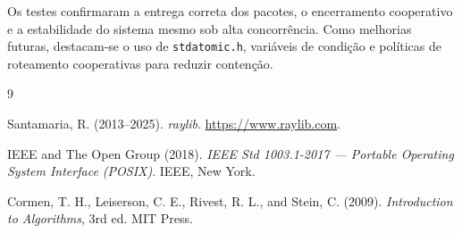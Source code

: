 \documentclass[12pt]{article}
\begin{document}
Os testes confirmaram a entrega correta dos pacotes, o encerramento cooperativo
e a estabilidade do sistema mesmo sob alta concorrência. Como melhorias futuras,
destacam-se o uso de \texttt{stdatomic.h}, variáveis de condição e políticas de
roteamento cooperativas para reduzir contenção.
\begin{thebibliography}{9}

Santamaria, R. (2013--2025).  \textit{raylib}.
\url{https://www.raylib.com}.

IEEE and The Open Group (2018).  \textit{IEEE Std 1003.1-2017 --- Portable
Operating System Interface (POSIX)}.  IEEE, New York.

Cormen, T. H., Leiserson, C. E., Rivest, R. L., and Stein, C. (2009).
\textit{Introduction to Algorithms}, 3rd ed.  MIT Press.

\end{thebibliography}
\end{document}
